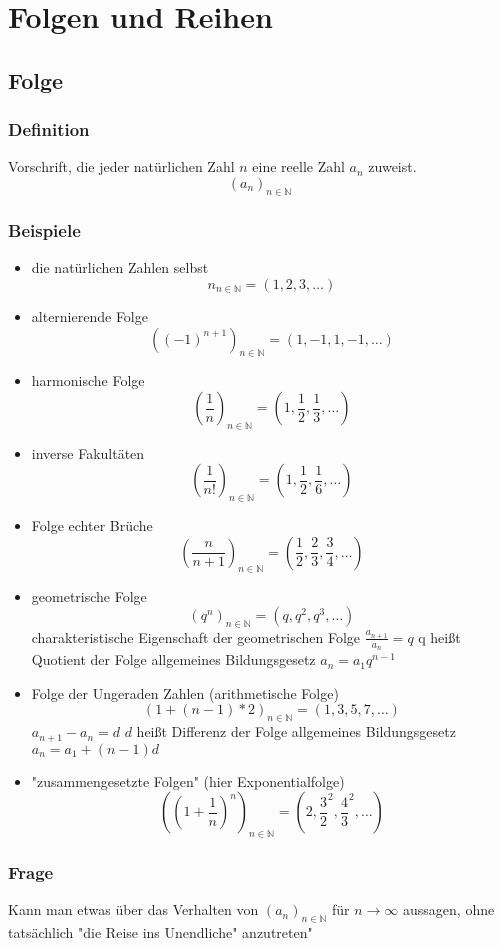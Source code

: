 \documentclass[11pt]{article}
\begin{document}
\section{Folgen und Reihen}
\label{sec-3}
\subsection{Folge}
\label{sec-3-1}
\subsubsection{Definition}
\label{sec-3-1-1}
Vorschrift, die jeder natürlichen Zahl $n$ eine reelle Zahl $a_n$ zuweist.
\[(a_n)_{n\in \mathbb{N}}\]
\subsubsection{Beispiele}
\label{sec-3-1-2}
\begin{itemize}
\item die natürlichen Zahlen selbst \[n_{n\in \mathbb{N}} = (1, 2, 3, \ldots)\]
\item alternierende Folge \[((-1)^{n+1})_{n\in \mathbb{N}} = (1, -1, 1, -1, \ldots)\]
\item harmonische Folge \[(\frac{1}{n})_{n\in \mathbb{N}} = (1, \frac{1}{2}, \frac{1}{3}, \ldots)\]
\item inverse Fakultäten \[(\frac{1}{n!})_{n\in \mathbb{N}}= (1, \frac{1}{2}, \frac{1}{6}, \ldots)\]
\item Folge echter Brüche \[(\frac{n}{n + 1})_{n\in \mathbb{N}} = (\frac{1}{2}, \frac{2}{3}, \frac{3}{4}, \ldots)\]
\item geometrische Folge \[(q^n)_{n\in \mathbb{N}} = (q, q^2,q^3, \ldots)\]
charakteristische Eigenschaft der geometrischen Folge $\frac{a_{n+1}}{a_n} = q$ q heißt Quotient der Folge
allgemeines Bildungsgesetz $a_n = a_1 q^{n-1}$
\item Folge der Ungeraden Zahlen (arithmetische Folge) \[(1+(n-1)*2)_{n\in \mathbb{N}} = (1, 3, 5, 7, \ldots)\]
$a_{n+1} - a_n = d$ $d$ heißt Differenz der Folge
allgemeines Bildungsgesetz $a_n = a_1 + (n - 1) d$
\item "zusammengesetzte Folgen" (hier Exponentialfolge) \[((1 + \frac{1}{n})^n)_{n\in \mathbb{N}} = (2, \frac{3}{2}^2, \frac{4}{3}^2, \ldots)\]
\end{itemize}
\subsubsection{Frage}
\label{sec-3-1-3}
Kann man etwas über das Verhalten von $(a_n)_{n\in \mathbb{N}}$ für $n \to \infty$ aussagen, ohne tatsächlich "die Reise ins Unendliche" anzutreten"
\end{document}
